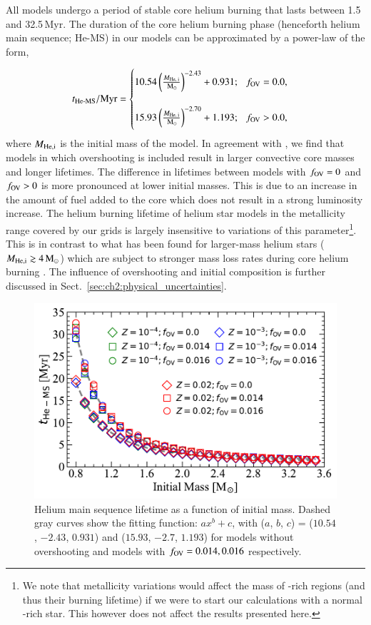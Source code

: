 \documentclass[main.tex]{subfiles}
\begin{document}
All models undergo a  period of stable core helium burning that lasts between 1.5 and 32.5\,Myr. The duration of the core helium burning phase (henceforth helium main sequence; He-MS) in our models can be approximated by a power-law of the form,

\begin{equation}\label{eq:tams_power_law}
    t_{\text{He-MS}}/{\rm Myr} = 
    \begin{cases}
        10.54 \left(\frac{M_{\text{He, i}}}{\mathrm{\,M_\odot}}\right)^{-2.43} + 0.931; \hspace{0.25cm} f_{\text{OV}} = 0.0, \\ \\
        15.93 \left(\frac{M_{\text{He, i}}}{\mathrm{\,M_\odot}}\right)^{-2.70} + 1.193; \hspace{0.25cm} f_{\text{OV}} > 0.0, 
    \end{cases}
\end{equation}
where $M_{\rm{He, i}}$ is the initial mass of the model. In agreement with \cite{Yan_2016}, we find that models in which overshooting is included result in larger convective core masses and longer lifetimes. 
The difference in lifetimes between models with $f_{\rm OV}=0$ and $f_{\rm OV}>0$ is more pronounced at lower 
initial masses. This is due to an increase in the amount of fuel added to the core which does not result in a 
strong luminosity increase. The helium burning lifetime of helium star models in the metallicity range covered by our grids is largely insensitive to variations of this parameter\footnote{We note that metallicity variations would affect the mass of -rich regions (and thus their burning lifetime) if we were to start our calculations with a normal -rich star. This however does not affect the results presented here.}. This is in contrast to what has been found for larger-mass helium stars ($M_{\rm{He, i}} \gtrsim 4\mathrm{\,M_\odot}$) which are subject to stronger mass loss rates during core helium burning \citep{Aguilera-Dena:2021abc}. The influence of overshooting and initial composition is further discussed in Sect.~\ref{sec:ch2:physical_uncertainties}. 


\begin{figure}[h!]
    \centering
    \includegraphics[width=0.5\columnwidth]{figures/chapter2/tams/hetams_vs_mass.pdf}
    \caption{Helium main sequence lifetime as a function of initial mass. Dashed gray curves show the fitting function: $ax^b + c$, with ($a$, $b$, $c$) = ($10.54$, $-2.43$, $0.931$) and ($15.93$, $-2.7$, $1.193$) for models without overshooting and models with $f_{\rm OV} = 0.014, 0.016$ respectively.}
    \label{fig:tams_vs_mass}
\end{figure}
\end{document}
